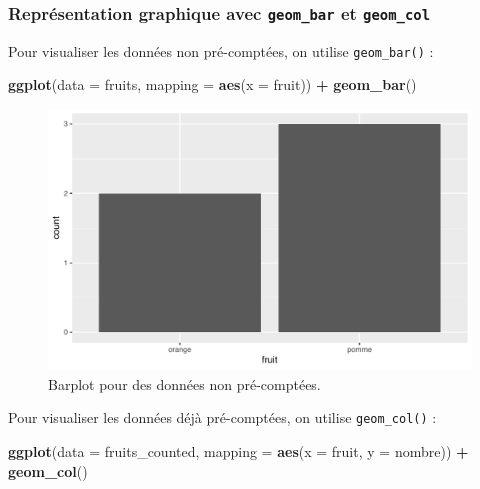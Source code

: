 \documentclass[a4paperpaper,]{article}
\newenvironment{Shaded}{\begin{snugshade}}{\end{snugshade}}
\newcommand{\KeywordTok}[1]{\textcolor[rgb]{0.13,0.29,0.53}{\textbf{#1}}}
\newcommand{\DataTypeTok}[1]{\textcolor[rgb]{0.13,0.29,0.53}{#1}}
\newcommand{\StringTok}[1]{\textcolor[rgb]{0.31,0.60,0.02}{#1}}
\newcommand{\OperatorTok}[1]{\textcolor[rgb]{0.81,0.36,0.00}{\textbf{#1}}}
\newcommand{\NormalTok}[1]{#1}
\theoremstyle{definition}
\theoremstyle{definition}
\theoremstyle{definition}
\theoremstyle{remark}
\begin{document}
\subsubsection{\texorpdfstring{Représentation graphique avec
\texttt{geom\_bar} et
\texttt{geom\_col}}{Représentation graphique avec geom\_bar et geom\_col}}\label{representation-graphique-avec-geom_bar-et-geom_col}

Pour visualiser les données non pré-comptées, on utilise
\texttt{geom\_bar()} :

\begin{Shaded}
\begin{Highlighting}[]
\KeywordTok{ggplot}\NormalTok{(}\DataTypeTok{data =}\NormalTok{ fruits, }\DataTypeTok{mapping =} \KeywordTok{aes}\NormalTok{(}\DataTypeTok{x =}\NormalTok{ fruit)) }\OperatorTok{+}
\StringTok{  }\KeywordTok{geom_bar}\NormalTok{()}
\end{Highlighting}
\end{Shaded}

\begin{figure}[htpb]

{\centering \includegraphics[width=0.9\linewidth]{figure/barplot-1} 

}

\caption{Barplot pour des données non pré-comptées.}\label{fig:barplot}
\end{figure}

Pour visualiser les données déjà pré-comptées, on utilise
\texttt{geom\_col()} :

\begin{Shaded}
\begin{Highlighting}[]
\KeywordTok{ggplot}\NormalTok{(}\DataTypeTok{data =}\NormalTok{ fruits_counted, }\DataTypeTok{mapping =} \KeywordTok{aes}\NormalTok{(}\DataTypeTok{x =}\NormalTok{ fruit, }\DataTypeTok{y =}\NormalTok{ nombre)) }\OperatorTok{+}
\StringTok{  }\KeywordTok{geom_col}\NormalTok{()}
\end{Highlighting}
\end{Shaded}
\end{document}
